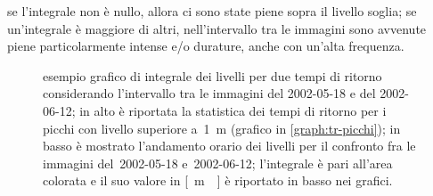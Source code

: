 se l'integrale non è nullo, allora ci sono state piene sopra il livello soglia;
se un'integrale è maggiore di altri, nell'intervallo tra le immagini sono avvenute piene particolarmente intense e/o durature, anche con un'alta frequenza.
%
\begin{figure}
	\centering
		
	\caption[esempio di integrale dei livelli]{esempio grafico di integrale dei livelli per due tempi di ritorno considerando l'intervallo tra le immagini \AST{} del 2002-05-18 e del 2002-06-12; in alto è riportata la statistica dei tempi di ritorno per i picchi con livello superiore a~\SI{1}{\m} (grafico in \cref{graph:tr-picchi}); in basso è mostrato l'andamento orario dei livelli per il confronto fra le immagini \AST{} del~2002-05-18 e~2002-06-12; l'integrale è pari all'area colorata e il suo valore in \si{[\m\giorno]} è riportato in basso nei grafici.}
	\label{graph:esempio-integrale-livelli}
\end{figure}
%

